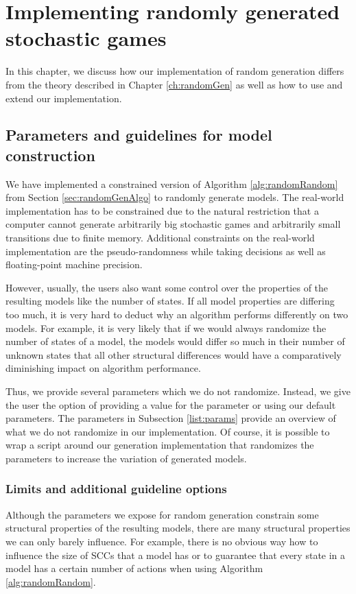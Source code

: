 \chapter{Implementing randomly generated stochastic games} \label{ch:implementedRandomGen}
In this chapter, we discuss how our implementation of random generation differs from the theory described in Chapter \ref{ch:randomGen} as well as how to use and extend our implementation. 

\section{Parameters and guidelines for model construction} \label{sec:guidelines}
We have implemented a constrained version of Algorithm \ref{alg:randomRandom} from Section \ref{sec:randomGenAlgo} to randomly generate models.
The real-world implementation has to be constrained due to the natural restriction that a computer cannot generate arbitrarily big stochastic games and 
arbitrarily small transitions due to finite memory. Additional constraints on the real-world implementation are the pseudo-randomness while taking decisions as well as
floating-point machine precision.

However, usually, the users also want some control over the properties of the resulting models like the number of states.
If all model properties are differing too much, it is very hard to deduct why an algorithm performs differently on two models.
For example, it is very likely that if we would always randomize the number of states of a model, the models would differ so much in their number of unknown states that all other structural differences 
would have a comparatively diminishing impact on algorithm performance.

Thus, we provide several parameters which we do not randomize. Instead, we give the user the option of providing a value for the parameter or using our default parameters.
The parameters in Subsection \ref{list:params} provide an overview of what we do not randomize in our implementation.
Of course, it is possible to wrap a script around our generation implementation that randomizes the parameters to increase the variation of generated models.

\subsection*{Limits and additional guideline options} \label{sec:guidelinesSubsec}
Although the parameters we expose for random generation constrain some structural properties of the resulting models, 
there are many structural properties we can only barely influence. For example, there is no obvious way how to influence the size of SCCs that a model has or to guarantee
that every state in a model has a certain number of actions when using Algorithm \ref{alg:randomRandom}.

